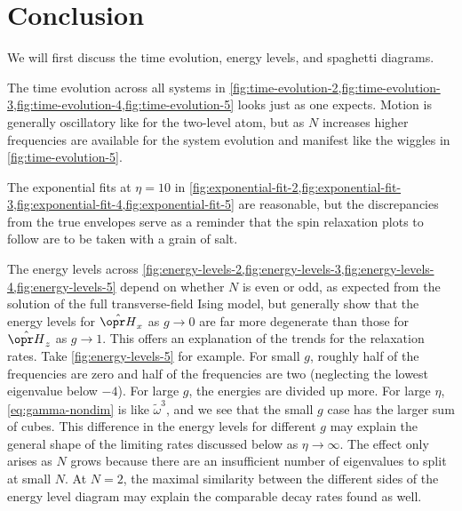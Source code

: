 \chapter*{Conclusion}

We will first discuss the time evolution, energy levels, and spaghetti diagrams.

The time evolution across all systems in
\cref{fig:time-evolution-2,fig:time-evolution-3,fig:time-evolution-4,fig:time-evolution-5}
looks just as one expects. Motion is generally oscillatory like for the
two-level atom, but as $N$ increases higher frequencies are available for the
system evolution and manifest like the wiggles in \cref{fig:time-evolution-5}.

The exponential fits at $\eta = 10$ in
\cref{fig:exponential-fit-2,fig:exponential-fit-3,fig:exponential-fit-4,fig:exponential-fit-5}
are reasonable, but the discrepancies from the true envelopes serve as a
reminder that the spin relaxation plots to follow are to be taken with a grain
of salt.

The energy levels across
\cref{fig:energy-levels-2,fig:energy-levels-3,fig:energy-levels-4,fig:energy-levels-5}
depend on whether $N$ is even or odd, as expected from the solution of the full
transverse-field Ising model, but generally show that the energy levels for
$\hat{\ham}_x$ as $g \to 0$ are far more degenerate than those for
$\hat{\ham}_z$ as $g \to 1$. This offers an explanation of the trends for the
relaxation rates. Take \cref{fig:energy-levels-5} for example. For small $g$,
roughly half of the frequencies are zero and half of the frequencies are two
(neglecting the lowest eigenvalue below $-4$). For large $g$, the energies are
divided up more. For large $\eta$, \cref{eq:gamma-nondim} is like
$\tilde{\omega}^3$, and we see that the small $g$ case has the larger sum of
cubes. This difference in the energy levels for different $g$ may explain the
general shape of the limiting rates discussed below as $\eta \to \infty$. The
effect only arises as $N$ grows because there are an insufficient number of
eigenvalues to split at small $N$. At $N = 2$, the maximal similarity between
the different sides of the energy level diagram may explain the comparable decay
rates found as well.

